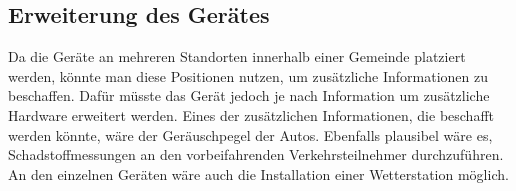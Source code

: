 \subsection{Erweiterung des Gerätes}
Da die Geräte an mehreren Standorten innerhalb einer Gemeinde platziert werden, könnte man diese Positionen nutzen, um zusätzliche Informationen zu beschaffen. Dafür müsste das Gerät jedoch je nach Information um zusätzliche Hardware erweitert werden. Eines der zusätzlichen Informationen, die beschafft werden könnte, wäre der Geräuschpegel der Autos. Ebenfalls plausibel wäre es, Schadstoffmessungen an den vorbeifahrenden Verkehrsteilnehmer durchzuführen. An den einzelnen Geräten wäre auch die Installation einer Wetterstation möglich.